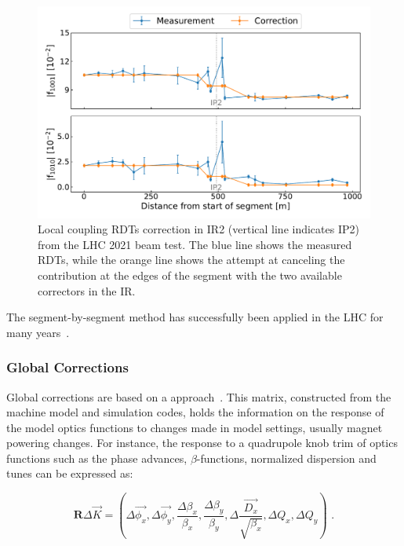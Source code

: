 \begin{figure}[!hbt]
  \centering
  \includegraphics*[width=0.99\linewidth]{Figures/Optics_Measurements_Corrections_at_LHC/sbs_coupling_ip2_example.pdf}
  \caption{Local coupling RDTs correction in IR\num{2} (vertical line indicates IP\num{2}) from the LHC \num{2021} beam test. The \textcolor{mplblue}{blue} line shows the measured RDTs, while the \textcolor{mplorange}{orange} line shows the attempt at canceling the contribution at the edges of the segment with the two available correctors in the IR.}
  \label{figure:example_sbs_correction_coupling}
\end{figure}

The segment-by-segment method has successfully been applied in the LHC for many years~\cite{PRAB:Aiba:First_Beating_Measurement_LHC,PRAB:Tomas:Record_Low_Beta_Beating_in_the_LHC,PRAB:Persson:LHC_Optics_Commissioning_OnePercent}.

\subsubsection*{Global Corrections}

Global corrections are based on a  approach~\cite{PHD:Vanbavinckhove,EPAC:Tomas:Procedures_Accuracy_Estimates_Beta_Beat_Correction_LHC}.
This matrix, constructed from the machine model and simulation codes, holds the information on the response of the model optics functions to changes made in model settings, usually magnet powering changes.
For instance, the response to a quadrupole \gls{knob} \gls{trim} of optics functions such as the phase advances, \(\beta\)-functions, normalized dispersion and tunes can be expressed as:

\begin{equation}
  \mathbf{R} \Delta \vec{K} = \left(\Delta \overrightarrow{\phi_x}, \Delta \overrightarrow{\phi_y}, \frac{\Delta \beta_x}{\beta_x}, \frac{\Delta \beta_y}{\beta_y}, \Delta \frac{\overrightarrow{D_x}}{\sqrt{\beta_x}}, \Delta Q_x, \Delta Q_y \right) \text{ .}
  \label{equation:response_matrix}
\end{equation}

